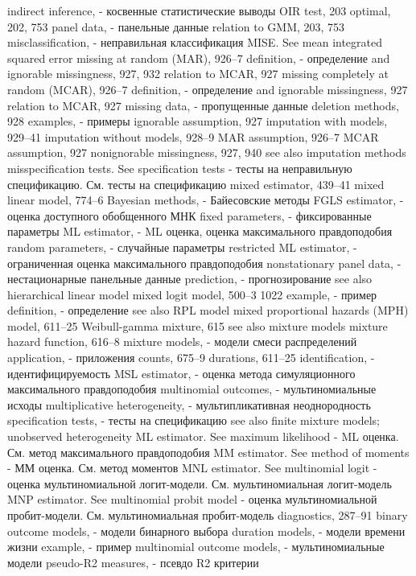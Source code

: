 indirect inference, - косвенные статистические выводы 
OIR test, 203
optimal, 202, 753
panel data, - панельные данные 
relation to GMM, 203, 753
misclassification, - неправильная классификация
MISE. See mean integrated squared error missing at random (MAR), 926–7
definition, - определение
and ignorable missingness, 927, 932 relation to MCAR, 927
missing completely at random (MCAR), 926–7
definition, - определение
and ignorable missingness, 927 relation to MCAR, 927
missing data, - пропущенные данные
deletion methods, 928
examples, - примеры
ignorable assumption, 927 imputation with models, 929–41 imputation without models, 928–9 MAR assumption, 926–7
MCAR assumption, 927 nonignorable missingness, 927, 940 see also imputation methods
misspecification tests. See specification tests - тесты на неправильную спецификацию. См. тесты на спецификацию
mixed estimator, 439–41
mixed linear model, 774–6
Bayesian methods, - Байесовские методы
FGLS estimator, - оценка доступного обобщенного МНК
fixed parameters, - фиксированные параметры
ML estimator, - ML оценка, оценка максимального правдоподобия
random parameters, - случайные параметры
restricted ML estimator, - ограниченная оценка максимального правдоподобия
nonstationary panel data, - нестационарные панельные данные
prediction, - прогнозирование
see also hierarchical linear model mixed logit model, 500–3
1022
example, - пример
definition, - определение
see also RPL model
mixed proportional hazards (MPH) model, 611–25
Weibull-gamma mixture, 615
see also mixture models mixture hazard function, 616–8 
mixture models, - модели смеси распределений
application, - приложения
counts, 675–9
durations, 611–25
identification, - идентифицируемость
MSL estimator, - оценка метода симуляционного максимального правдоподобия
multinomial outcomes, - мультиномиальные исходы
multiplicative heterogeneity, - мультипликативная неоднородность
specification tests, - тесты на спецификацию
see also finite mixture models; unobserved heterogeneity
ML estimator. See maximum likelihood - ML оценка. См. метод максимального правдоподобия
MM estimator. See method of moments - ММ оценка. См. метод моментов
MNL estimator. See multinomial logit - оценка мультиномиальной логит-модели. См. мультиномиальная логит-модель
MNP estimator. See multinomial probit model - оценка мультиномиальной пробит-модели. См. мультиномиальная пробит-модель
diagnostics, 287–91
binary outcome models, - модели бинарного выбора 
duration models, - модели времени жизни 
example, - пример
multinomial outcome models, - мультиномиальные модели 
pseudo-R2 measures, - псевдо R2 критерии
